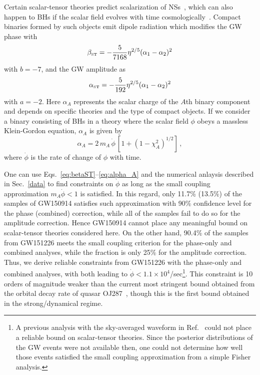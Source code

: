 \documentclass[prd,twocolumn,nofootinbib]{revtex4-1}
\newcommand\be{\begin{equation}}
\newcommand\ee{\end{equation}}
\newcommand{\ST}{{\mbox{\tiny ST}}}
\begin{document}
Certain scalar-tensor theories predict scalarization of NSs~\cite{PhysRevLett.70.2220,Barausse:2012da}, which can also happen to BHs if the scalar field evolves with time cosmologically~\cite{Jacobson:1999vr,Horbatsch:2011ye}. Compact binaries formed by such objects emit dipole radiation which modifies the GW phase with~\cite{Freire:2012mg,Wex:2014nva,Tahura:2018zuq}
\be\label{eq:betaST}
\beta_{\ST}=-\frac{5}{7168}\eta ^{2/5}(\alpha_1-\alpha_2)^2
\ee
with $b=-7$, and the GW amplitude as~\cite{Tahura:2018zuq}
\be\label{eq:alphaST}
\alpha_{\ST}=-\frac{5}{192}\eta ^{2/5}(\alpha_1-\alpha_2)^2
\ee
with $a=-2$. Here $\alpha_A$ represents the scalar charge of the $A$th binary component and depends on specific theories and the type of compact objects. If we consider a binary consisting of BHs in a theory where the scalar field $\phi$ obeys a massless Klein-Gordon equation, $\alpha_A$ is given by~\cite{Horbatsch:2011ye}
\be\label{eq:alpha_A}
\alpha_A = 2 \, m_A \, \dot \phi\, [1+(1-\chi_A^2)^{1/2}]\,,
\ee
where $\dot{\phi}$ is the rate of change of $\phi$ with time.

One can use Eqs.~\eqref{eq:betaST}--\eqref{eq:alpha_A} and the numerical anlaysis described in Sec.~\ref{data} to find constraints on $\dot{\phi}$ as long as the small coupling approximation $m_A\dot{\phi}<1$ is satisfied. In this regard, only 11.7\% (13.5\%) of the samples of GW150914 satisfies such approximation with 90\% confidence level for the phase (combined) correction, while all of the samples fail to do so for the amplitude correction. Hence GW150914 cannot place any meaningful bound on scalar-tensor theories considered here. On the other hand, 90.4\% of the samples from GW151226 meets the small coupling criterion for the phase-only and combined analyses, while the fraction is only 25\% for the amplitude correction. Thus, we derive reliable constraints from GW151226 with the phase-only and combined analyses, with both leading to $\dot{\phi}<1.1\times10^4$/sec\footnote{A previous analysis with the sky-averaged waveform in Ref.~\cite{Yunes:2016jcc} could not place a reliable bound on scalar-tensor theories. Since the posterior distributions of the GW events were not available then, one could not determine how well those events satisfied the small coupling approximation from a simple Fisher analysis.}. This constraint is 10 orders of magnitude weaker than the current most stringent bound obtained from the orbital decay rate of quasar OJ287~\cite{Horbatsch:2011ye}, though this is the first bound obtained in the strong/dynamical regime.
\end{document}
